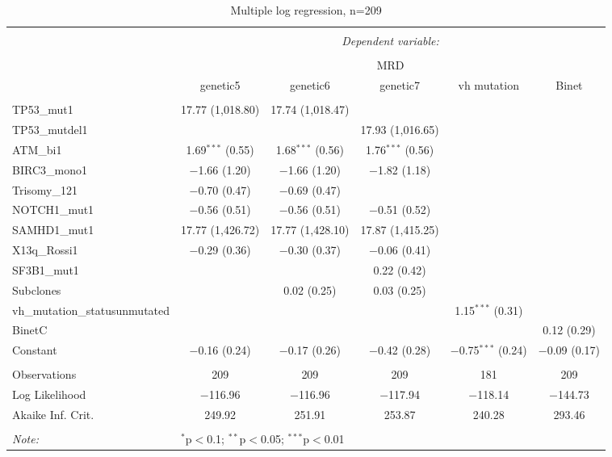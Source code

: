\documentclass[a4paper,11pt]{article}
\begin{document}
\begin{table}[!htbp] \centering 
  \caption{Multiple log regression, n=209} 
  \label{} 
\tiny 
\begin{tabular}{@{\extracolsep{5pt}}lccccc} 
\\[-1.8ex]\hline 
\hline \\[-1.8ex] 
 & \multicolumn{5}{c}{\textit{Dependent variable:}} \\ 
\cline{2-6} 
\\[-1.8ex] & \multicolumn{5}{c}{MRD} \\ 
 & genetic5 & genetic6 & genetic7 & vh mutation & Binet \\ 
\hline \\[-1.8ex] 
 TP53\_mut1 & 17.77 (1,018.80) & 17.74 (1,018.47) &  &  &  \\ 
  TP53\_mutdel1 &  &  & 17.93 (1,016.65) &  &  \\ 
  ATM\_bi1 & 1.69$^{***}$ (0.55) & 1.68$^{***}$ (0.56) & 1.76$^{***}$ (0.56) &  &  \\ 
  BIRC3\_mono1 & $-$1.66 (1.20) & $-$1.66 (1.20) & $-$1.82 (1.18) &  &  \\ 
  Trisomy\_121 & $-$0.70 (0.47) & $-$0.69 (0.47) &  &  &  \\ 
  NOTCH1\_mut1 & $-$0.56 (0.51) & $-$0.56 (0.51) & $-$0.51 (0.52) &  &  \\ 
  SAMHD1\_mut1 & 17.77 (1,426.72) & 17.77 (1,428.10) & 17.87 (1,415.25) &  &  \\ 
  X13q\_Rossi1 & $-$0.29 (0.36) & $-$0.30 (0.37) & $-$0.06 (0.41) &  &  \\ 
  SF3B1\_mut1 &  &  & 0.22 (0.42) &  &  \\ 
  Subclones &  & 0.02 (0.25) & 0.03 (0.25) &  &  \\ 
  vh\_mutation\_statusunmutated &  &  &  & 1.15$^{***}$ (0.31) &  \\ 
  BinetC &  &  &  &  & 0.12 (0.29) \\ 
  Constant & $-$0.16 (0.24) & $-$0.17 (0.26) & $-$0.42 (0.28) & $-$0.75$^{***}$ (0.24) & $-$0.09 (0.17) \\ 
 \hline \\[-1.8ex] 
Observations & 209 & 209 & 209 & 181 & 209 \\ 
Log Likelihood & $-$116.96 & $-$116.96 & $-$117.94 & $-$118.14 & $-$144.73 \\ 
Akaike Inf. Crit. & 249.92 & 251.91 & 253.87 & 240.28 & 293.46 \\ 
\hline 
\hline \\[-1.8ex] 
\textit{Note:}  & \multicolumn{5}{l}{$^{*}$p$<$0.1; $^{**}$p$<$0.05; $^{***}$p$<$0.01} \\ 
\end{tabular} 
\end{table} 
\end{document}
